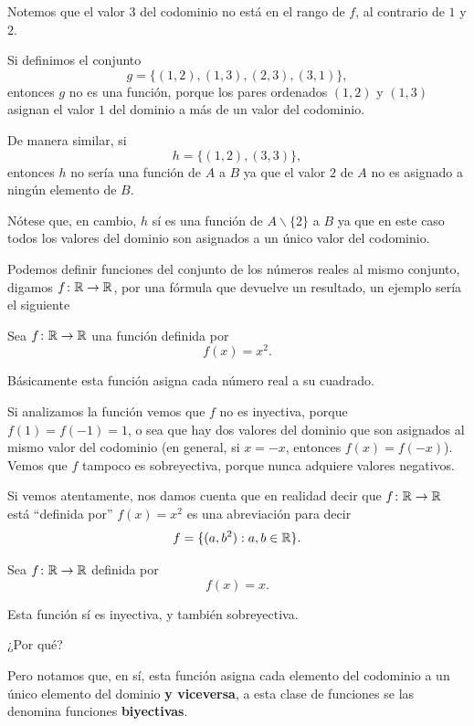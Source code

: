 Notemos que el valor $3$ del codominio
no está en el rango de $f$, al contrario de $1$ y $2$.

Si definimos el conjunto
\[g = \{(1, 2), (1, 3), (2, 3), (3, 1)\},\]
entonces $g$ no es una función,
porque los pares ordenados
$(1, 2)$ y $(1, 3)$ asignan el valor $1$
del dominio a más de un valor del codominio.

De manera similar, si
\[h = \{(1, 2), (3, 3)\},\]
entonces $h$ no sería una función de
$A$ a $B$ ya que el valor $2$ de
$A$ no es asignado a ningún elemento
de $B$.
\begin{remark}
	Nótese que, en cambio, $h$ sí es una función
	de $A\backslash\{2\}$ a $B$ ya que en este caso
	todos los valores del dominio
	son asignados a un único valor del codominio.
\end{remark}

Podemos definir funciones del conjunto de
los números reales al mismo conjunto,
digamos $f \colon \mathbb R \to \mathbb R$, por una
fórmula que devuelve un resultado, un ejemplo sería
el siguiente

\begin{example}
	Sea $f \colon \mathbb R \to \mathbb R$ una función
	definida por
	\[f(x) = x^2.\]
\end{example}

Básicamente esta función asigna cada número real a
su cuadrado.

Si analizamos la función vemos que $f$ no es inyectiva,
porque $f(1) = f(-1) = 1$, o sea que hay dos valores del
dominio que son asignados al mismo valor del codominio
(en general, si $x = -x$, entonces $f(x) = f(-x)$).
Vemos que $f$ tampoco es sobreyectiva,
porque nunca adquiere valores negativos.

Si vemos atentamente, nos damos cuenta que
en realidad decir que $f \colon \mathbb R \to \mathbb R$
está ``definida por'' $f(x) = x^2$ es una abreviación para decir
\[f = \{(a, b^2) : a, b \in \mathbb R\}.\]

\begin{example}
	Sea $f \colon \mathbb R \to \mathbb R$ definida por
	\[f(x) = x.\]
\end{example}

Esta función sí es inyectiva, y también sobreyectiva.
\begin{question*}
	¿Por qué?
\end{question*}

Pero notamos que, en sí, esta función asigna
cada elemento del codominio a un único
elemento del dominio \textbf{y viceversa},
a esta clase de funciones se las denomina
funciones \textbf{biyectivas}.

